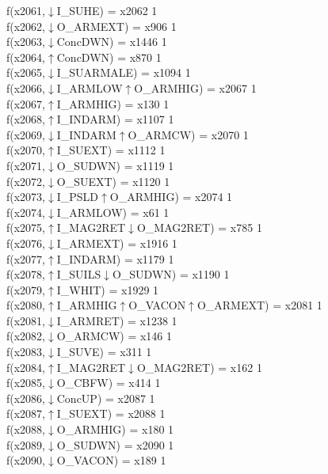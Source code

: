 f(x2061,$\downarrow$I\_SUHE) = x2062 {1} \\
f(x2062,$\downarrow$O\_ARMEXT) = x906 {1} \\
f(x2063,$\downarrow$ConcDWN) = x1446 {1} \\
f(x2064,$\uparrow$ConcDWN) = x870 {1} \\
f(x2065,$\downarrow$I\_SUARMALE) = x1094 {1} \\
f(x2066,$\downarrow$I\_ARMLOW$\uparrow$O\_ARMHIG) = x2067 {1} \\
f(x2067,$\uparrow$I\_ARMHIG) = x130 {1} \\
f(x2068,$\uparrow$I\_INDARM) = x1107 {1} \\
f(x2069,$\downarrow$I\_INDARM$\uparrow$O\_ARMCW) = x2070 {1} \\
f(x2070,$\uparrow$I\_SUEXT) = x1112 {1} \\
f(x2071,$\downarrow$O\_SUDWN) = x1119 {1} \\
f(x2072,$\downarrow$O\_SUEXT) = x1120 {1} \\
f(x2073,$\downarrow$I\_PSLD$\uparrow$O\_ARMHIG) = x2074 {1} \\
f(x2074,$\downarrow$I\_ARMLOW) = x61 {1} \\
f(x2075,$\uparrow$I\_MAG2RET$\downarrow$O\_MAG2RET) = x785 {1} \\
f(x2076,$\downarrow$I\_ARMEXT) = x1916 {1} \\
f(x2077,$\uparrow$I\_INDARM) = x1179 {1} \\
f(x2078,$\uparrow$I\_SUILS$\downarrow$O\_SUDWN) = x1190 {1} \\
f(x2079,$\uparrow$I\_WHIT) = x1929 {1} \\
f(x2080,$\uparrow$I\_ARMHIG$\uparrow$O\_VACON$\uparrow$O\_ARMEXT) = x2081 {1} \\
f(x2081,$\downarrow$I\_ARMRET) = x1238 {1} \\
f(x2082,$\downarrow$O\_ARMCW) = x146 {1} \\
f(x2083,$\downarrow$I\_SUVE) = x311 {1} \\
f(x2084,$\uparrow$I\_MAG2RET$\downarrow$O\_MAG2RET) = x162 {1} \\
f(x2085,$\downarrow$O\_CBFW) = x414 {1} \\
f(x2086,$\downarrow$ConcUP) = x2087 {1} \\
f(x2087,$\uparrow$I\_SUEXT) = x2088 {1} \\
f(x2088,$\downarrow$O\_ARMHIG) = x180 {1} \\
f(x2089,$\downarrow$O\_SUDWN) = x2090 {1} \\
f(x2090,$\downarrow$O\_VACON) = x189 {1} \\
